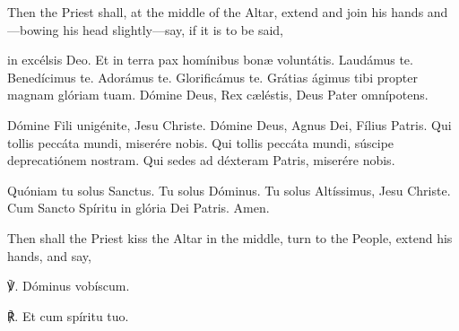 \begin{rubric}
    Then the Priest shall, at the middle of the Altar, extend and join his hands and---bowing his head slightly---say, if it is to be said,
\end{rubric}
 in excélsis Deo. Et in terra pax homínibus bon{\ae} voluntátis. Laudámus te. Benedícimus te. Adorámus te. Glorificámus te. Grátias ágimus tibi propter magnam glóriam tuam. Dómine Deus, Rex c{\ae}léstis, Deus Pater omnípotens.\par
    Dómine Fili unigénite, Jesu Christe. Dómine Deus, Agnus Dei, Fílius Patris. Qui tollis peccáta mundi, miserére nobis. Qui tollis peccáta mundi, súscipe deprecatiónem nostram. Qui sedes ad déxteram Patris, miserére nobis.\par
    Quóniam tu solus Sanctus. Tu solus Dóminus. Tu solus Altíssimus, Jesu Christe. Cum Sancto Spíritu {} in glória Dei Patris. Amen.

\begin{rubric}
    Then shall the Priest kiss the Altar in the middle, turn to the People, extend his hands, and say,
\end{rubric}
℣. Dóminus vobíscum.

℟. Et cum spíritu tuo.


